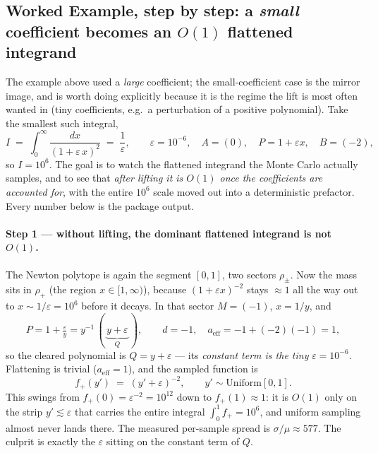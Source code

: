 \documentclass[11pt,a4paper]{article}
\begin{document}
\subsection{Worked Example, step by step: a \emph{small} coefficient becomes an \texorpdfstring{$O(1)$}{O(1)} flattened integrand}\label{sec:lift-example-small}

The example above used a \emph{large} coefficient; the small-coefficient case is
the mirror image, and is worth doing explicitly because it is the regime the lift
is most often wanted in (tiny coefficients, e.g.\ a perturbation of a positive
polynomial). Take the smallest such integral,
\begin{equation}\label{eq:toy0-small}
I \;=\; \int_0^\infty \frac{dx}{(1+\varepsilon\,x)^2} \;=\; \frac{1}{\varepsilon},
\qquad \varepsilon = 10^{-6},\quad A=(0),\quad P=1+\varepsilon x,\quad B=(-2),
\end{equation}
so $I = 10^{6}$. The goal is to watch the flattened integrand the Monte Carlo
actually samples, and to see that \emph{after lifting it is $O(1)$ once the
coefficients are accounted for}, with the entire $10^{6}$ scale moved out into a
deterministic prefactor. Every number below is the package output.

\paragraph{Step 1 --- without lifting, the dominant flattened integrand is not $O(1)$.}
The Newton polytope is again the segment $[0,1]$, two sectors $\rho_\pm$. Now the
mass sits in $\rho_+$ (the region $x\in[1,\infty)$), because $(1+\varepsilon x)^{-2}$
stays $\approx 1$ all the way out to $x\sim 1/\varepsilon = 10^{6}$ before it
decays. In that sector $M=(-1)$, $x = 1/y$, and
\begin{equation}
P = 1 + \tfrac{\varepsilon}{y} = y^{-1}\,(\,\underbrace{y+\varepsilon}_{Q}\,),
\qquad d=-1,\quad a_{\mathrm{eff}} = -1 + (-2)(-1) = 1,
\end{equation}
so the cleared polynomial is $Q = y+\varepsilon$ --- its \emph{constant term is the
tiny} $\varepsilon=10^{-6}$. Flattening is trivial ($a_{\mathrm{eff}}=1$), and the
sampled function is
\begin{equation}\label{eq:lift-bad-small}
f_+(y') \;=\; (y'+\varepsilon)^{-2},\qquad y'\sim\mathrm{Uniform}[0,1].
\end{equation}
This swings from $f_+(0)=\varepsilon^{-2}=10^{12}$ down to $f_+(1)\approx 1$: it is
$O(1)$ only on the strip $y'\lesssim\varepsilon$ that carries the entire integral
$\int_0^1 f_+ = 10^{6}$, and uniform sampling almost never lands there. The
measured per-sample spread is $\sigma/\mu \approx 577$. The culprit is exactly the
$\varepsilon$ sitting on the constant term of $Q$.
\end{document}
